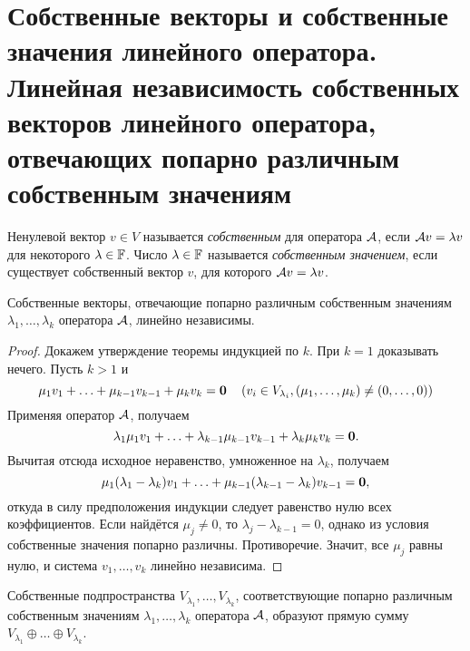 \section{Собственные векторы и собственные значения линейного оператора. Линейная независимость собственных векторов линейного оператора, отвечающих попарно различным собственным значениям}

\begin{definition}
    Ненулевой вектор $v \in V$ называется \textit{собственным} для оператора $\mathcal{A}$, если $\mathcal{A} v = \lambda v$ для некоторого $\lambda \in \mathbb{F}$. Число $\lambda \in \mathbb{F}$ называется \textit{собственным значением}, если существует собственный вектор $v$, для которого $\mathcal{A} v = \lambda v$.
\end{definition}

\begin{proposal}
    Собственные векторы, отвечающие попарно различным собственным значениям $\lambda_1, \ldots, \lambda_k$ оператора $\mathcal{A}$, линейно независимы.
\end{proposal}

\begin{proof}
    Докажем утверждение теоремы индукцией по $k$. При $k = 1$ доказывать нечего. Пусть $k > 1$ и
    \[
        \mu_1v_1 + \ldots + \mu_{k - 1}v_{k - 1} + \mu_kv_k = \boldsymbol{0}\quad\left(v_i \in V_{\lambda_i}, (\mu_1, \ldots, \mu_k) \ne (0, \ldots, 0)\right)
    \]
    Применяя оператор $\mathcal{A}$, получаем
    \[
        \lambda_1\mu_1v_1 + \ldots + \lambda_{k - 1}\mu_{k - 1}v_{k - 1} + \lambda_k\mu_kv_k = \boldsymbol{0}.
    \]
    Вычитая отсюда исходное неравенство, умноженное на $\lambda_k$, получаем
    \[
        \mu_1(\lambda_1 - \lambda_k)v_1 + \ldots + \mu_{k - 1}(\lambda_{k - 1} - \lambda_k)v_{k - 1} = \boldsymbol{0},
    \]
    откуда в силу предположения индукции следует равенство нулю всех коэффициентов. Если найдётся $\mu_j \ne 0$, то $\lambda_j - \lambda_{k - 1} = 0$, однако из условия собственные значения попарно различны. Противоречие. Значит, все $\mu_j$ равны нулю, и система $v_1, \ldots, v_k$ линейно независима.
\end{proof}

\begin{corollary}
    Собственные подпространства $V_{\lambda_1}, \ldots, V_{\lambda_k}$, соответствующие попарно различным собственным значениям $\lambda_1, \ldots, \lambda_k$ оператора $\mathcal{A}$, образуют прямую сумму $V_{\lambda_1} \oplus \ldots \oplus V_{\lambda_k}$.
\end{corollary}

